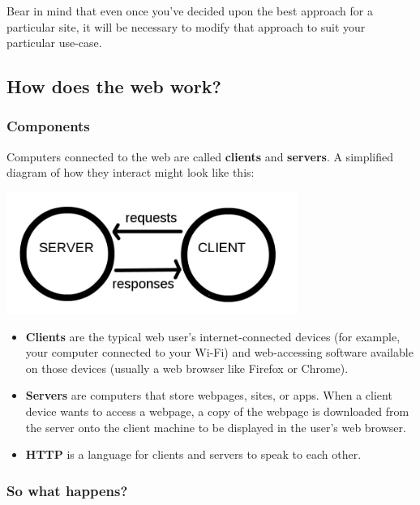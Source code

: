 \documentclass[]{book}
\providecommand{\tightlist}{%
  \setlength{\itemsep}{0pt}\setlength{\parskip}{0pt}}
\begin{document}
Bear in mind that even once you've decided upon the best approach for a particular site, it will be necessary to modify that approach to suit your particular use-case.

\hypertarget{how-does-the-web-work}{%
\subsection{How does the web work?}\label{how-does-the-web-work}}

\hypertarget{components}{%
\subsubsection{Components}\label{components}}

Computers connected to the web are called \textbf{clients} and \textbf{servers}. A simplified diagram of how they interact might look like this:

\includegraphics{Python/PythonWebScrape/images/client_server.png}

\begin{itemize}
\tightlist
\item
  \textbf{Clients} are the typical web user's internet-connected devices (for example, your computer connected to your Wi-Fi) and web-accessing software available on those devices (usually a web browser like Firefox or Chrome).
\item
  \textbf{Servers} are computers that store webpages, sites, or apps. When a client device wants to access a webpage, a copy of the webpage is downloaded from the server onto the client machine to be displayed in the user's web browser.
\item
  \textbf{HTTP} is a language for clients and servers to speak to each other.
\end{itemize}

\hypertarget{so-what-happens}{%
\subsubsection{So what happens?}\label{so-what-happens}}
\end{document}
